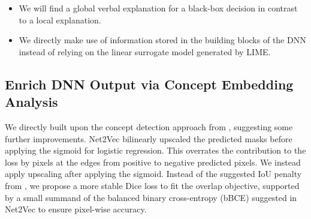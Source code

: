 \begin{itemize}
\item We will find a global verbal explanation for a black-box
  decision in contrast to a local explanation.
\item We directly make use of information stored in the building
  blocks of the DNN instead of relying on the linear surrogate
  model generated by LIME.
\end{itemize}

\subsection{Enrich DNN Output via Concept Embedding Analysis}
We directly built upon the concept detection approach
from \cite{fong_net2vec_2018,schwalbe_concept_2020}, suggesting some
further improvements.
Net2Vec bilinearly upscaled the predicted masks before
applying the sigmoid for logistic regression.
This overrates the contribution to the loss by pixels at
the edges from positive to negative predicted pixels. We instead
apply upscaling after applying the sigmoid.
% 
Instead of the suggested IoU penalty from
\cite{schwalbe_concept_2020}, we propose a more stable
Dice loss to fit the overlap objective, supported by a small summand
of the balanced binary cross-entropy (bBCE) suggested in Net2Vec to
ensure pixel-wise accuracy.

